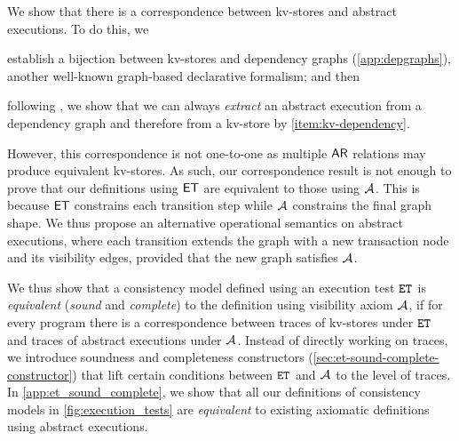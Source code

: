 We show that there is a correspondence between kv-stores and abstract executions.
To do this, we 
\begin{enumerate*}
	\item establish a bijection between kv-stores and dependency graphs (\cref{app:depgraphs}),
	\label{item:kv-dependency}
another well-known graph-based declarative formalism; and then
	\item following \cite{laws}, we show that we can always \emph{extract} an abstract execution from a dependency graph and therefore from a kv-store by \ref{item:kv-dependency}. 
\end{enumerate*}
However, this correspondence is not one-to-one 
as multiple $\mathsf{AR}$ relations may produce equivalent kv-stores.
As such, our correspondence result is not enough to prove that 
our definitions using \( \mathsf{ET} \) are equivalent to those using \( \visaxioms \).
This is because \( \mathsf{ET} \) constrains each transition step while \( \visaxioms\) constrains the final graph shape.
We thus propose an alternative operational semantics on abstract executions,
where each transition extends the graph with a 
new transaction node and its visibility edges, 
provided that the new graph satisfies \( \visaxioms \).

We thus show that a consistency model defined using an execution test \( \et \) is \emph{equivalent}
(\ie \emph{sound} and \emph{complete})
to the definition using visibility axiom \( \visaxioms \),
if for every program there is a correspondence
between traces of kv-stores under \( \et \) and 
traces of abstract executions under \( \visaxioms \).
Instead of directly working on traces,
we introduce soundness and completeness constructors (\cref{sec:et-sound-complete-constructor})
that lift certain conditions between \( \et \) and \( \visaxioms \) to the level of traces. 
In \cref{app:et_sound_complete}, we show that 
all our definitions of consistency models in \cref{fig:execution_tests} 
are \emph{equivalent} to existing axiomatic definitions using abstract executions.

